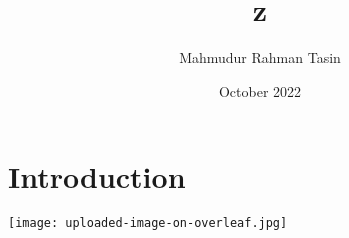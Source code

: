 \documentclass{article}
\title{z}
\author{Mahmudur Rahman Tasin}
\date{October 2022}
\begin{document}

\section{Introduction}
\texttt{[image: uploaded-image-on-overleaf.jpg]}
\end{document}
